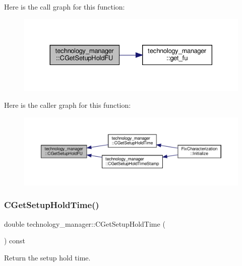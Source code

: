 Here is the call graph for this function\+:
\nopagebreak
\begin{figure}[H]
\begin{center}
\leavevmode
\includegraphics[width=330pt]{df/dc7/classtechnology__manager_a0bac2f5f755bb68d306334e434ca1d2b_cgraph}
\end{center}
\end{figure}
Here is the caller graph for this function\+:
\nopagebreak
\begin{figure}[H]
\begin{center}
\leavevmode
\includegraphics[width=350pt]{df/dc7/classtechnology__manager_a0bac2f5f755bb68d306334e434ca1d2b_icgraph}
\end{center}
\end{figure}
\mbox{\label{classtechnology__manager_ab25d130e2a4fe506fcb50d5c0f46d8bd}} 
\subsubsection{\texorpdfstring{C\+Get\+Setup\+Hold\+Time()}{CGetSetupHoldTime()}}
{\footnotesize\ttfamily double technology\+\_\+manager\+::\+C\+Get\+Setup\+Hold\+Time (\begin{DoxyParamCaption}{ }\end{DoxyParamCaption}) const}



Return the setup hold time. 

